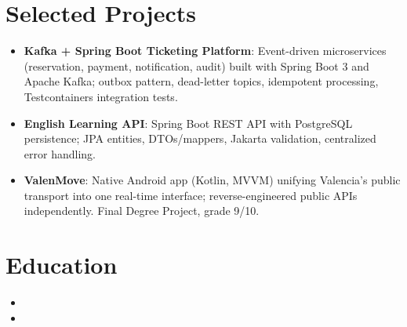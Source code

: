 \documentclass[11pt,a4paper,sans]{moderncv}
\begin{document}
\section{Selected Projects}
\vspace{1pt}
\begin{itemize}

\item \textbf{Kafka + Spring Boot Ticketing Platform}: Event-driven microservices (reservation, payment, notification, audit) built with Spring Boot 3 and Apache Kafka; outbox pattern, dead-letter topics, idempotent processing, Testcontainers integration tests.

\item \textbf{English Learning API}: Spring Boot REST API with PostgreSQL persistence; JPA entities, DTOs/mappers, Jakarta validation, centralized error handling.

\item \textbf{ValenMove}: Native Android app (Kotlin, MVVM) unifying Valencia's public transport into one real-time interface; reverse-engineered public APIs independently. Final Degree Project, grade 9/10.

\end{itemize}


\section{Education}
\vspace{1pt}
\begin{itemize}

\item{}

\vspace{3pt}

\item{}

\end{itemize}
\end{document}
